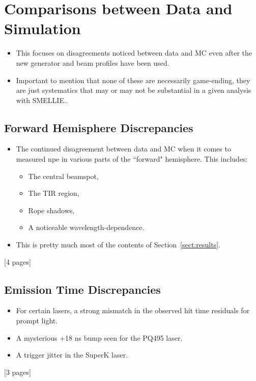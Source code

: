 \section{Comparisons between Data and Simulation}\label{sec:smellie_systematics}
{
    \color{blue}
    \begin{itemize}
        \item This focuses on disagreements noticed between data and MC even after the new generator and beam profiles have been used.
        \item Important to mention that none of these are necessarily game-ending, they are just systematics that may or may not be substantial in a given analysis with SMELLIE..
    \end{itemize}
    
    \subsection{Forward Hemisphere Discrepancies}
    \begin{itemize}
        \item The continued disagreement between data and MC when it comes to measured npe in various parts of the ``forward" hemisphere. This includes:
        \begin{itemize}
            \item The central beamspot,
            \item The TIR region,
            \item Rope shadows,
            \item A noticeable wavelength-dependence.
        \end{itemize}
        \item This is pretty much most of the contents of Section~\ref{sect:results}.
    \end{itemize}
    [4 pages]
    
    \subsection{Emission Time Discrepancies}
    \begin{itemize}
        \item For certain lasers, a strong mismatch in the observed hit time residuals for prompt light.
        \item A mysterious +18 ns bump seen for the PQ495 laser.
        \item A trigger jitter in the SuperK laser.
    \end{itemize}
    [3 pages]
}
